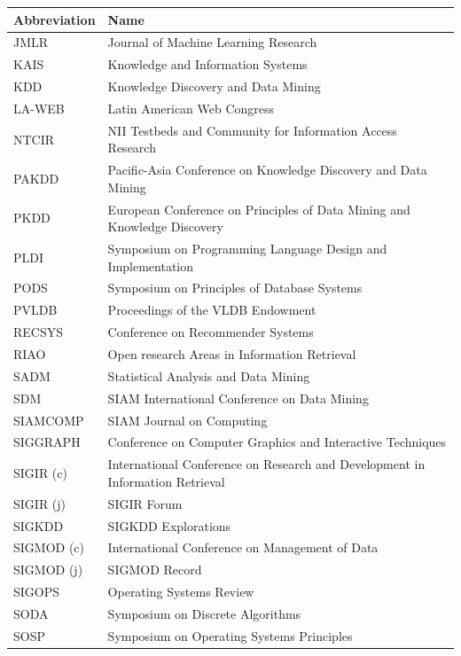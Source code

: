 \documentclass[msc]{ppgccufmg}
\begin{document}
\begin{appendices}
\begin{table}[h]
\scriptsize
\centering
\begin{tabular}{ll} 
\toprule
Abbreviation & Name          \\
\midrule
JMLR					&		Journal of Machine Learning Research  \\ 
KAIS					&		Knowledge and Information Systems  \\ 
KDD					&		Knowledge Discovery and Data Mining  \\ 
LA-WEB					&		Latin American Web Congress  \\ 
NTCIR					&		NII Testbeds and Community for Information Access Research  \\ 
PAKDD					&		Pacific-Asia Conference on Knowledge Discovery and Data Mining  \\ 
PKDD					&		European Conference on Principles of Data Mining and Knowledge Discovery  \\ 
PLDI					&		Symposium on Programming Language Design and Implementation  \\ 
PODS					&		Symposium on Principles of Database Systems  \\ 
PVLDB					&		Proceedings of the VLDB Endowment  \\ 
RECSYS					&		Conference on Recommender Systems  \\ 
RIAO					&		Open research Areas in Information Retrieval  \\ 
SADM					&		Statistical Analysis and Data Mining  \\ 
SDM					&		SIAM International Conference on Data Mining  \\ 
SIAMCOMP					&		SIAM Journal on Computing  \\ 
SIGGRAPH					&		Conference on Computer Graphics and Interactive Techniques  \\ 
SIGIR (c)					&		International Conference on Research and Development in Information Retrieval  \\ 
SIGIR (j)					&		SIGIR Forum  \\ 
SIGKDD					&		SIGKDD Explorations  \\ 
SIGMOD (c)					&		International Conference on Management of Data  \\ 
SIGMOD (j)					&		SIGMOD Record  \\ 
SIGOPS					&		Operating Systems Review  \\ 
SODA					&		Symposium on Discrete Algorithms  \\ 
SOSP					&		Symposium on Operating Systems Principles  \\ 

\end{tabular}
\end{table}
\end{appendices}
\end{document}
